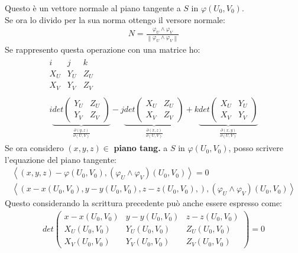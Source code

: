 \documentclass[a4paper, oneside]{article}
\begin{document}
Questo è un vettore normale al piano tangente a $S$ in $\varphi(U_0, V_0)$.\\
Se ora lo divido per la sua norma ottengo il versore normale:
\begin{gather*}
  N = \frac{\varphi_U \land \varphi_V}{\left\lVert \varphi_U \land \varphi_V \right\rVert }
\end{gather*}
Se rappresento questa operazione con una matrice ho:
\begin{gather*}
  \begin{matrix}
    i & j & k\\
    X_U & Y_U & Z_U\\
    X_V & Y_V & Z_V
  \end{matrix}\\
  \begin{matrix}
    i \underbrace{det\begin{pmatrix}
      Y_U & Z_U\\
      Y_V & Z_V
    \end{pmatrix}}_{\frac{\partial (y,z)}{\partial (U,V)}}   - j \underbrace{det\begin{pmatrix}
      X_U & Z_U\\
      X_V & Z_V
    \end{pmatrix}}_{\frac{\partial (x,z)}{\partial (U,V)}} + k \underbrace{det\begin{pmatrix}
      X_U & Y_U\\
      X_V & Y_V
    \end{pmatrix}}_{\frac{\partial (x,y)}{\partial (U,V)}}
  \end{matrix}
\end{gather*}
Se ora considero $(x,y,z) \in$ \textbf{piano tang.} a $S$ in $\varphi(U_0, V_0)$, posso scrivere l'equazione del piano tangente:
\begin{gather*}
  \left\langle (x,y,z) - \varphi(U_0, V_0) , (\varphi_U \land \varphi_V)(U_0, V_0)\right\rangle = 0\\
  \left\langle \left(x-x(U_0,V_0), y-y(U_0,V_0), z-z(U_0,V_0),\right) , (\varphi_U \land \varphi_V)(U_0, V_0)  \right\rangle 
\end{gather*} 
Questo considerando la scrittura precedente può anche essere espresso come:
\begin{gather*}
  det \begin{pmatrix}
    x - x(U_0,V_0) & y - y(U_0,V_0) & z - z(U_0,V_0)\\
    X_U(U_0,V_0) & Y_U(U_0,V_0) & Z_U(U_0,V_0)\\
    X_V(U_0,V_0) & Y_V(U_0,V_0) & Z_V(U_0,V_0)
  \end{pmatrix} = 0
\end{gather*}
\end{document}
